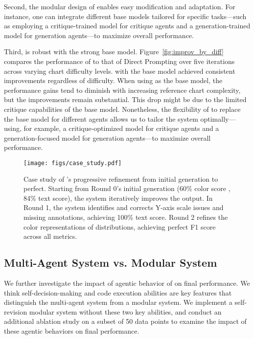 Second, the modular design of \model{} enables easy modification and adaptation. For instance, one can integrate different base models tailored for specific tasks—such as employing a critique-trained model for critique agents and a generation-trained model for generation agents—to maximize overall performance. 

Third, \model{} is robust with the strong base model. Figure~\ref{fig:improv_by_diff} compares the performance of \model{} to that of Direct Prompting over five iterations across varying chart difficulty levels. \model{} with the \gpt base model achieved consistent improvements regardless of difficulty. When using \llama as the base model, the performance gains tend to diminish with increasing reference chart complexity, but the improvements remain substantial. This drop might be due to the limited critique capabilities of the \llama base model. Nonetheless, the flexibility of \model{} to replace the base model for different agents allows us to tailor the system optimally—using, for example, a critique-optimized model for critique agents and a generation-focused model for generation agents—to maximize overall performance.

\begin{figure*}[ht]
    \centering
    \texttt{[image: figs/case\_study.pdf]}
    \caption{Case study of \model{}'s progressive refinement from initial generation to perfect. Starting from Round 0's initial generation (60\% color score , 84\% text score), the system iteratively improves the output. In Round 1, the system identifies and corrects Y-axis scale issues and missing annotations, achieving 100\% text score. Round 2 refines the color representations of distributions, achieving perfect F1 score across all metrics.}
    \label{fig:case_study}
    \vspace{-0.08in}
\end{figure*}

\subsection{Multi-Agent System vs. Modular System}
\label{sec:result_agentic_vs_modular}

We further investigate the impact of agentic behavior of \model{} on final performance. We think self-decision-making and code execution abilities are key features that distinguish the multi-agent system from a modular system. We implement a self-revision modular system without these two key abilities,  and conduct an additional ablation study on a subset of 50 data points to examine the impact of these agentic behaviors on final performance.

